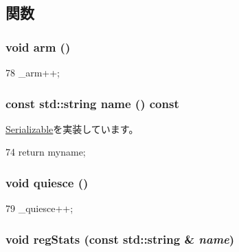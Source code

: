 \subsection{関数}
\hypertarget{classKernel_1_1Statistics_a03d5bebb6b9658c96966bad93b776195}{
\subsubsection[{arm}]{\setlength{\rightskip}{0pt plus 5cm}void arm ()}}
\label{classKernel_1_1Statistics_a03d5bebb6b9658c96966bad93b776195}



\begin{DoxyCode}
78 { _arm++; }
\end{DoxyCode}
\hypertarget{classKernel_1_1Statistics_a6490f765a824ced1cc94979609fe7e07}{
\subsubsection[{name}]{\setlength{\rightskip}{0pt plus 5cm}const std::string name () const}}
\label{classKernel_1_1Statistics_a6490f765a824ced1cc94979609fe7e07}


\hyperlink{classSerializable_a2d319721a65496069642871a52e47056}{Serializable}を実装しています。


\begin{DoxyCode}
74 { return myname; }
\end{DoxyCode}
\hypertarget{classKernel_1_1Statistics_aabe90b7041b94c26647a5e08f194718b}{
\subsubsection[{quiesce}]{\setlength{\rightskip}{0pt plus 5cm}void quiesce ()}}
\label{classKernel_1_1Statistics_aabe90b7041b94c26647a5e08f194718b}



\begin{DoxyCode}
79 { _quiesce++; }
\end{DoxyCode}
\hypertarget{classKernel_1_1Statistics_a3dd3443357312bcb75580eaa508c48a4}{
\subsubsection[{regStats}]{\setlength{\rightskip}{0pt plus 5cm}void regStats (const std::string \& {\em name})}}
\label{classKernel_1_1Statistics_a3dd3443357312bcb75580eaa508c48a4}


